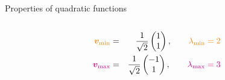 \begin{frame}{Properties of quadratic functions}
\begin{columns}
\begin{column}{0.5\textwidth}
\begin{footnotesize}
  \begin{eqnarray*}
    \textcolor{orange}{\bm{v}_\text{min}} &=& \frac{1}{\sqrt{2}}\begin{pmatrix} 1 \\ 1 \end{pmatrix}, \qquad \textcolor{orange}{\lambda_\text{min} = 2} \\
    \textcolor{magenta}{\bm{v}_\text{max}} &=& \frac{1}{\sqrt{2}}\begin{pmatrix} - 1 \\ 1 \end{pmatrix}, \qquad \textcolor{magenta}{\lambda_\text{max} = 3}
  \end{eqnarray*}  
  
  \end{footnotesize}
  \end{column}
  
  \end{columns}
  
  
  
  \end{frame}
  
